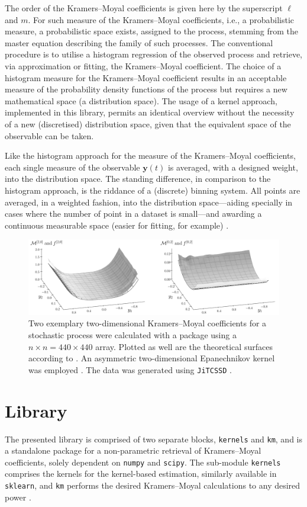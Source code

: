 \documentclass[showpacs,showkeys,10pt,onecolumn,superscriptaddress,notitlepage]{revtex4-1}
\begin{document}
The order of the Kramers--Moyal coefficients is given here by the superscript $\ell$ and $m$.
For such measure of the Kramers--Moyal coefficients, i.e., a probabilistic measure, a probabilistic space exists, assigned to the process, stemming from the master equation describing the family of such processes.
The conventional procedure is to utilise a histogram regression of the observed process and retrieve, via approximation or fitting, the Kramers--Moyal coefficient.
The choice of a histogram measure for the Kramers--Moyal coefficient results in an acceptable measure of the probability density functions of the process but requires a new mathematical space (a distribution space).
The usage of a kernel approach, implemented in this library, permits an identical overview without the necessity of a new (discretised) distribution space, given that the equivalent space of the observable can be taken.

Like the histogram approach for the measure of the Kramers--Moyal coefficients, each single measure of the observable $\boldsymbol{y}(t)$ is averaged, with a designed weight, into the distribution space.
The standing difference, in comparison to the histogram approach, is the riddance of a (discrete) binning system.
All points are averaged, in a weighted fashion, into the distribution space---aiding specially in cases where the number of point in a dataset is small---and awarding a continuous measurable space (easier for fitting, for example) \cite{Lamouroux}.

\begin{figure}[h]
    \centering
    \includegraphics[width=0.9\linewidth]{figure.png}
    \caption{Two exemplary two-dimensional Kramers--Moyal coefficients for a stochastic process were calculated with a package using a $n\times n = 440\times 440$ array. Plotted as well are the theoretical surfaces according to \cite{Anvari}. An asymmetric two-dimensional Epanechnikov kernel was employed \cite{Epanechnikov,Lamouroux}. The data was generated using \texttt{JiTCSSD} \cite{Ansmann}.}
\end{figure}

\section{Library}
The presented library is comprised of two separate blocks, \texttt{kernels} and \texttt{km}, and is a standalone package for a non-parametric retrieval of Kramers--Moyal coefficients, solely dependent on \texttt{numpy} and \texttt{scipy}. The sub-module \texttt{kernels} comprises the kernels for the kernel-based estimation, similarly available in \texttt{sklearn}, and \texttt{km} performs the desired Kramers--Moyal calculations to any desired power \cite{scikitlearn}.
\end{document}
